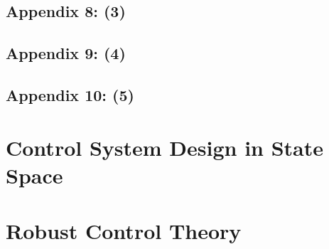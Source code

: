 \documentclass[11pt]{report}
\begin{document}
\section{Appendix 8: (3)}


\section{Appendix 9: (4)}


\section{Appendix 10: (5)}


\chapter{Control System Design in State Space}


\chapter{Robust Control Theory}

\end{document}
